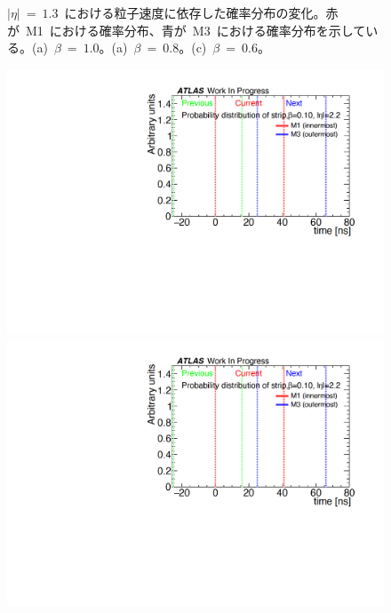 \begin{figure}[H]
\begin{minipage}{0.33\hsize}
    \subcaption{}
    \end{minipage}
    \caption[$|\eta|~=~1.3$~における粒子速度に依存した確率分布の変化]{$|\eta|~=~1.3$~における粒子速度に依存した確率分布の変化。赤が~M1~における確率分布、青が~M3~における確率分布を示している。(a)~$\beta~=~1.0$。(a)~$\beta~=~0.8$。(c)~$\beta~=~0.6$。}\label{fig:recbeta}
\end{figure}

\begin{figure}[H]
    \begin{minipage}{0.33\hsize}
    \centering   
    \includegraphics[width=\textwidth,page=11]{img/rec/rec_e2.2_s.pdf}
    \subcaption{}
    \end{minipage}
    \begin{minipage}{0.33\hsize}
    \centering   
    \includegraphics[width=\textwidth,page=9]{img/rec/rec_e2.2_s.pdf}

\end{minipage}
\end{figure}
